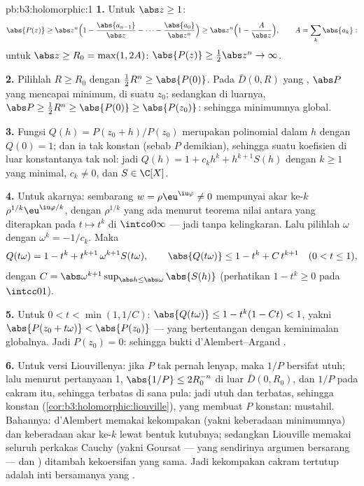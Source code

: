 \begin{solution}{pb:b3:holomorphic:1}
\textbf{1.} Untuk $\abs z \geq 1$:
\[
\abs{P(z)} \geq \abs z^n\Bigl(1 -
\frac{\abs{a_{n-1}}}{\abs z} - \dots -
\frac{\abs{a_0}}{\abs z^n}\Bigr)
\geq \abs z^n\Bigl(1 - \frac{A}{\abs z}\Bigr),
\qquad A = \sum_k\abs{a_k} :
\]
untuk $\abs z \geq R_0 = \max(1, 2A)$: $\abs{P(z)} \geq
\frac12\abs z^n \to \infty$.

\textbf{2.} Pilihlah $R \geq R_0$ dengan $\frac12R^n \geq
\abs{P(0)}$. Pada $\bar D(0, R)$ yang , $\abs P$ yang 
mencapai minimum, di suatu $z_0$; sedangkan di luarnya, $\abs P
\geq \frac12R^n \geq \abs{P(0)} \geq \abs{P(z_0)}$: sehingga
minimumnya global.

\textbf{3.} Fungsi $Q(h) = P(z_0 + h)/P(z_0)$ merupakan polinomial dalam $h$
dengan $Q(0) = 1$; dan ia tak konstan (sebab $P$ demikian), sehingga suatu
koefisien di luar konstantanya tak nol: jadi $Q(h) = 1 +
c_kh^k + h^{k+1}S(h)$ dengan $k \geq 1$ yang minimal, $c_k \neq 0$, dan
$S \in \C[X]$.

\textbf{4.} Untuk akarnya: sembarang $w = \rho\eu^{\iu\varphi} \neq 0$ mempunyai
akar ke-$k$ $\rho^{1/k}\eu^{\iu\varphi/k}$, dengan
$\rho^{1/k}$ yang ada menurut teorema nilai antara yang diterapkan
pada $t \mapsto t^k$ di $\intco0\infty$ --- jadi tanpa kelingkaran.
Lalu pilihlah $\omega$ dengan $\omega^k = -1/c_k$. Maka
\[
Q(t\omega) = 1 - t^k + t^{k+1}\,\omega^{k+1}S(t\omega),
\qquad
\abs{Q(t\omega)} \leq 1 - t^k + C\,t^{k+1}
\quad (0 < t \leq 1),
\]
dengan $C = \abs\omega^{k+1}\sup_{\abs h \leq
\abs\omega}\abs{S(h)}$ (perhatikan $1 - t^k \geq 0$ pada $\intcc01$).

\textbf{5.} Untuk $0 < t < \min(1, 1/C)$: $\abs{Q(t\omega)}
\leq 1 - t^k(1 - Ct) < 1$, yakni $\abs{P(z_0 + t\omega)} <
\abs{P(z_0)}$ --- yang bertentangan dengan keminimalan globalnya. Jadi
$P(z_0) = 0$: sehingga bukti d'Alembert--Argand .

\textbf{6.} Untuk versi Liouvillenya: jika $P$ tak pernah lenyap, maka $1/P$
bersifat utuh; lalu menurut pertanyaan 1, $\abs{1/P} \leq 2R_0^{-n}$ di luar
$\bar D(0, R_0)$, dan $1/P$  pada cakram 
itu, sehingga terbatas di sana pula: jadi utuh dan terbatas, sehingga konstan
(\cref{cor:b3:holomorphic:liouville}), yang membuat $P$ konstan:
mustahil. Bahannya: d'Alembert memakai kekompakan (yakni keberadaan
minimumnya) dan keberadaan akar ke-$k$ lewat bentuk kutubnya;
sedangkan Liouville memakai seluruh perkakas Cauchy (yakni Goursat ---
yang sendirinya argumen  bersarang --- dan ) ditambah kekoersifan yang sama. Jadi kekompakan cakram
tertutup adalah inti bersamanya yang .


\end{solution}
